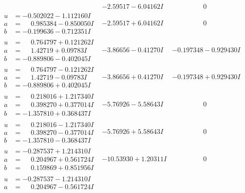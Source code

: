 \documentclass[1p]{elsarticle_modified}
\theoremstyle{definition}
\begin{document}
$$\begin{array}{c|c|c}
 & -2.59517 - 6.04162 I & \phantom{-0.000000 } 0 \\ \hline\begin{aligned}
u &= -0.502022 - 1.112160 I \\
a &= \phantom{-}0.985384 - 0.850050 I \\
b &= -0.199636 - 0.712351 I\end{aligned}
 & -2.59517 + 6.04162 I & \phantom{-0.000000 } 0 \\ \hline\begin{aligned}
u &= \phantom{-}0.764797 + 0.121262 I \\
a &= \phantom{-}1.42719 + 0.09783 I \\
b &= -0.889806 - 0.402045 I\end{aligned}
 & -3.86656 - 0.41270 I & -0.197348 - 0.929430 I \\ \hline\begin{aligned}
u &= \phantom{-}0.764797 - 0.121262 I \\
a &= \phantom{-}1.42719 - 0.09783 I \\
b &= -0.889806 + 0.402045 I\end{aligned}
 & -3.86656 + 0.41270 I & -0.197348 + 0.929430 I \\ \hline\begin{aligned}
u &= \phantom{-}0.218016 + 1.217340 I \\
a &= \phantom{-}0.398270 + 0.377014 I \\
b &= -1.357810 + 0.368437 I\end{aligned}
 & -5.76926 - 5.58643 I & \phantom{-0.000000 } 0 \\ \hline\begin{aligned}
u &= \phantom{-}0.218016 - 1.217340 I \\
a &= \phantom{-}0.398270 - 0.377014 I \\
b &= -1.357810 - 0.368437 I\end{aligned}
 & -5.76926 + 5.58643 I & \phantom{-0.000000 } 0 \\ \hline\begin{aligned}
u &= -0.287537 + 1.214310 I \\
a &= \phantom{-}0.204967 + 0.561724 I \\
b &= \phantom{-}0.159869 + 0.851956 I\end{aligned}
 & -10.53930 + 1.20311 I & \phantom{-0.000000 } 0 \\ \hline\begin{aligned}
u &= -0.287537 - 1.214310 I \\
a &= \phantom{-}0.204967 - 0.561724 I \\

\end{aligned}
\end{array}$$
\end{document}
